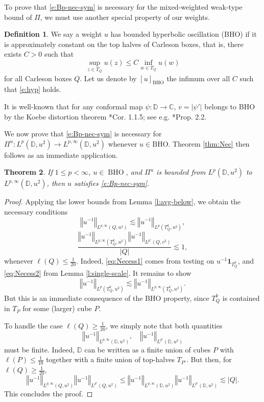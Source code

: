 \documentclass{amsart}
\newcommand{\norm}[1]{\left\Vert {#1}\right\Vert}
\newtheorem{theorem}{Theorem}[section]
\theoremstyle{definition}
\newtheorem{definition}[theorem]{Definition}
\numberwithin{equation}{section}
\DeclareMathOperator{\BHO}{BHO}
\begin{document}
To prove that \eqref{e:Bp-nec-sym} is necessary for the mixed-weighted weak-type bound of $\Pi$, 
we must use another special property of our weights.  
\begin{definition}\label{d:BHO}
We say a weight $u$ has bounded hyperbolic oscillation (BHO) if it is approximately constant on the top halves of Carleson boxes, that is, 
there exists $C>0$ such that
 	\begin{equation}\label{e:hyp} \sup_{z \in T_Q} u(z) \le C \inf_{w \in T_Q} u(w)\end{equation}
for all Carleson boxes $Q$. Let us denote by $[u]_{\BHO}$ the infimum over all $C$ such that \eqref{e:hyp} holds.
\end{definition}
\noindent It is well-known that for any conformal map $\psi \colon \mathbb D \to \mathbb C$, $v=|\psi'|$ belongs to BHO by the Koebe distortion theorem \cite{Pom92}*{Cor. 1.1.5}; see e.g. \cite{GW24}*{Prop. 2.2}.

We now prove that \eqref{e:Bp-nec-sym} 
is necessary for $\Pi^u\colon L^p(\mathbb{D},u^2)\to L^{p,\infty}(\mathbb{D},u^2)$ whenever $u \in \text{BHO}$. Theorem \ref{thm:Nec} then follows as an immediate application.
\begin{theorem}\label{prop:GeneralNecessity}
If $1 \le p < \infty$, $u \in \BHO$, and $\Pi^u$ is bounded from $L^{p}(\mathbb{D},u^2)$ to $L^{p,\infty}(\mathbb{D},u^2)$, then $u$ satisfies \eqref{e:Bp-nec-sym}.
\end{theorem}
\begin{proof}
Applying the lower bounds from Lemma \ref{l:avg-below}, we obtain the necessary conditions
	\begin{equation} \norm{u^{-1}}_{L^{p,\infty}(Q,u^2)} \lesssim \norm{u^{-1}}_{L^{p}(T_Q^k,u^2)}, \label{eq:Necess1}  \end{equation}
	\begin{equation} \frac{\norm{u^{-1}}_{L^{p,\infty}(T_Q^k,u^2)} \norm{u^{-1}}_{L^{p'}(Q,v^2)}}{|Q|}\lesssim 1,\label{eq:Necess2}
   \end{equation}
whenever $\ell(Q) \le \frac{1}{20}$. Indeed, \eqref{eq:Necess1} comes from testing on $u^{-1} \mathbf 1_{T_Q^k}$, and \eqref{eq:Necess2} from Lemma \ref{l:single-scale}. It remains to show
	\[ \norm{u^{-1}}_{L^{p}(T_Q^k,u^2)} \lesssim \norm{u^{-1}}_{L^{p,\infty}(T_Q^k,u^2)}.\] 
But this is an immediate consequence of the BHO property, 
since $T_Q^k$ is contained in $T_P$ for some (larger) cube $P$.

To handle the case $\ell(Q) \ge \frac{1}{20}$, we simply note that both quantities
	\[ \norm{u^{-1}}_{L^{p,\infty}(\mathbb D, u^2)}, \quad \norm{u^{-1}}_{L^{p'}(\mathbb D,u^2)} \]
must be finite. Indeed, $\mathbb D$ can be written as a finite union of cubes $P$ with $\ell(P) \le \frac 1{10}$ together with a finite union of top-halves $T_{P'}$. But then, for $\ell(Q) \ge \frac 1{20}$, 
	\[ \norm{u^{-1}}_{L^{p,\infty}(Q,u^2)}\norm{u^{-1}}_{L^{p'}(Q,u^2)} \le \norm{u^{-1}}_{L^{p,\infty}(\mathbb D, u^2)} \norm{u^{-1}}_{L^{p'}(\mathbb D,u^2)} \lesssim |Q|.\]
This concludes the proof.
\end{proof}
\end{document}
